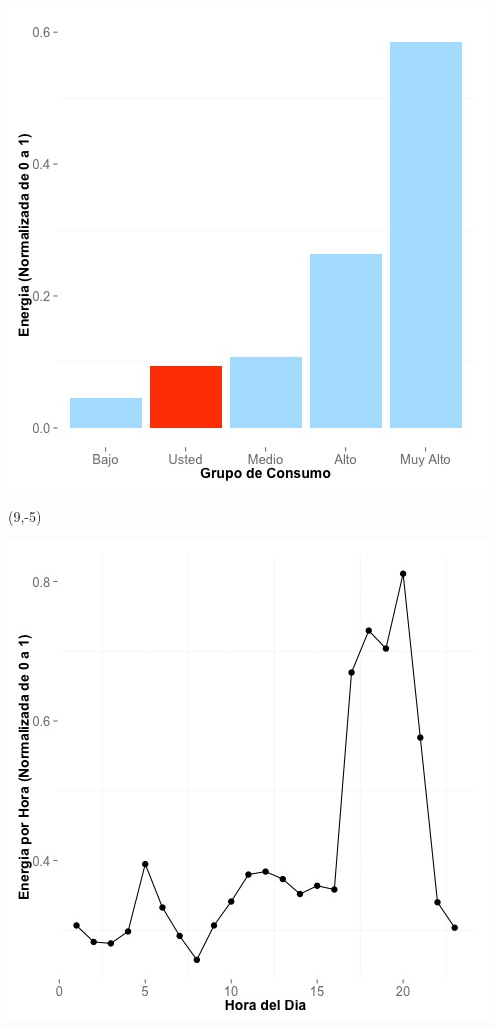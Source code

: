 \documentclass{article}\usepackage[]{graphicx}\usepackage[]{color}
\newenvironment{knitrout}{}{} %
\begin{document}
\begin{knitrout}
\color{fgcolor}
\includegraphics[scale=0.65]{figure/A7_neighbor_plot} 
\end{knitrout}

 \begin{textblock}{1}(9,-5)
\begin{minipage}{20em}
\begingroup

\endgroup
\end{minipage}
\end{textblock}


\begin{knitrout}
\color{fgcolor}
\includegraphics[scale=0.65]{figure/A7_plot_norm_median} 
\end{knitrout}
\end{document}
